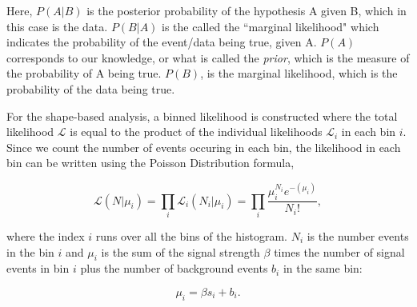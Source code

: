 
Here, $P(A|B)$ is the posterior probability of the hypothesis A given B, which in this case is the data. $P(B|A)$ is the called the ``marginal likelihood" which indicates the probability of the event/data being true, given A. $P(A)$ corresponds to our knowledge, or what is called the \textit{prior}, which is the measure of the probability of A being true.  $P(B)$, is the marginal likelihood, which is the probability of the data being true.

For the shape-based analysis, a binned likelihood is constructed where the total likelihood $\mathcal{L}$ is equal to the product of the individual likelihoods $\mathcal{L}_{i}$ in each bin $i$. Since we count the number of events occuring in each bin, the likelihood in each bin can be written using the Poisson Distribution formula,

\begin{equation} \label{eq:poisson_likelihood}
\mathcal{L}(N| \mu_i ) = \prod_{i} \mathcal{L}_{i}(N_i | \mu_i ) = \prod_{i} \frac{\mu_i^{N_i} e^{-(\mu_i)}}{N_i!},
\end{equation}

where the index $i$ runs over all the bins of the histogram. $N_i$ is the number events in the bin $i$ and $\mu_i$ is the sum of the signal strength $
\beta$ times the number of signal events in bin $i$ plus the number of background events $b_i$ in the same bin:

\begin{equation} \label{eq:splusb}
\mu_i = \beta s_{i} + b_i.
\end{equation}

